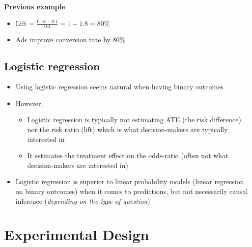 \documentclass[10pt]{article}
\begin{document}
\textbf{Previous example}
\begin{itemize}
    \item Lift = $\frac{0.18 - 0.1}{0.1} = 1 - 1.8 = 80\% $
    \item Ads improve conversion rate by $80\% $
\end{itemize}
\newpage 
\subsection{Logistic regression}
\begin{itemize}
    \item Using logistic regression seems natural when having binary outcomes 
    \item However, 
    \begin{itemize}
        \item Logistic regression is typically not estimating ATE (the risk difference) nor the risk ratio (lift) which is what decision-makers are typically interested in 
        \item It estimates the treatment effect on the odds-ratio (often not what decision-makers are interested in)
    \end{itemize}
    \item Logistic regression is superior to linear probability models (linear regression on binary outcomes) when it comes to predictions, but not necessarily causal inference (\textit{depending on the type of question})
\end{itemize}
\section{Experimental Design}
\end{document}
